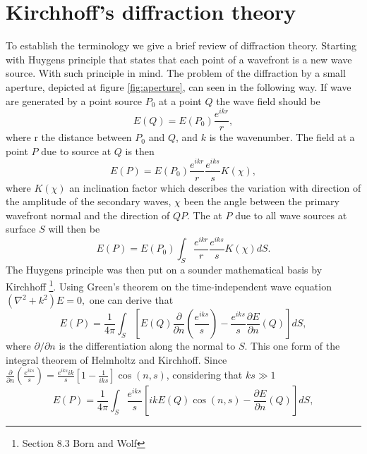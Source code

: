 \documentclass[12pt,twoside,english]{book}
\renewcommand{\~}{\perispomeni}%
\numberwithin{equation}{section}
\numberwithin{figure}{section}
\begin{document}
\section{Kirchhoff's diffraction theory}

\begin{figure}
\begin{minipage}[t]{0.48\textwidth}

\caption{}
\label{fig:aperture}
\end{minipage}
\hfill
\begin{minipage}[t]{0.48\textwidth}

\caption{}
\label{fig:aperture coord}
\end{minipage}
\end{figure}

To establish the terminology we give a brief review of diffraction theory. Starting with Huygens principle that states that each point of a wavefront is a new wave source. With such principle in mind. The problem of the diffraction by a small aperture, depicted at figure \ref{fig:aperture}, can seen in the following way. If wave are generated by a point source $P_{0}$ at a point $Q$ the wave field should be
\begin{equation}
E\left(Q\right)=E\left(P_{0}\right)\frac{e^{ikr}}{r},
\label{}
\end{equation}
where r the distance between $P_{0}$ and $Q$, and $k$ is the wavenumber. The field at a point $P$ due to source at $Q$ is then
\begin{equation}
E\left(P\right)=E\left(P_{0}\right)\frac{e^{ikr}}{r}\frac{e^{iks}}{s}K\left(\chi\right),
\end{equation}
where $K\left(\chi\right)$ an inclination factor which describes the variation with direction of the amplitude of the secondary waves, $\chi$ been the angle between the primary wavefront normal and the direction of $QP$. The at $P$ due to all wave sources at surface $S$ will then be
\begin{equation}
E\left(P\right)=E\left(P_{0}\right)\int_{S}\frac{e^{ikr}}{r}\frac{e^{iks}}{s}K\left(\chi\right)dS.
\label{eq:huygens formula}
\end{equation}
The Huygens principle was then put on a sounder mathematical basis by Kirchhoff \footnote{Section 8.3 Born and Wolf}. Using Green's theorem on the time-independent wave equation $\left(\nabla^{2}+k^{2}\right)E=0,$ one can derive that
\begin{equation}
E\left(P\right)=\frac{1}{4\pi}\int_{S}\left[E\left(Q\right)\frac{\partial}{\partial n}\left(\frac{e^{iks}}{s}\right)-\frac{e^{iks}}{s}\frac{\partial E}{\partial n}\left(Q\right)\right]dS,
\end{equation}
where $\partial/\partial n$ is the differentiation along the normal to $S$. This one form of the integral theorem of Helmholtz and Kirchhoff. Since $\frac{\partial}{\partial n}\left(\frac{e^{iks}}{s}\right)=\frac{e^{iks}ik}{s}\left[1-\frac{1}{iks}\right]\cos\left(n,s\right)$, considering that $ks\gg1$
\begin{equation}
E\left(P\right)=\frac{1}{4\pi}\int_{S}\frac{e^{iks}}{s}\left[ikE\left(Q\right)\cos\left(n,s\right)-\frac{\partial E}{\partial n}\left(Q\right)\right]dS,
\end{equation}
\end{document}
